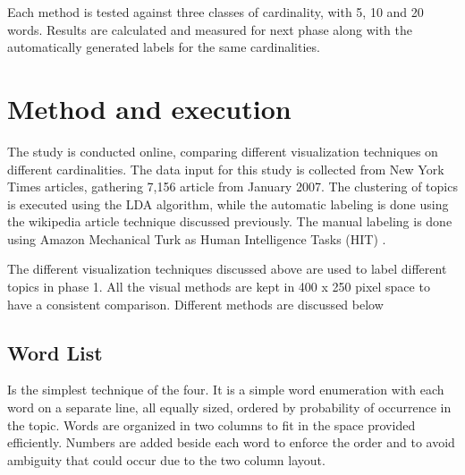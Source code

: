 \newParagraph
Each method is tested against three classes of cardinality, with 5, 10 and 20 words. Results are calculated and measured for next phase along with the automatically
generated labels for the same cardinalities.

\section{Method and execution}
\label{sec:method}

The study is conducted online, comparing different visualization techniques on different cardinalities. The data input for this study is collected from New
 York Times articles, gathering 7,156 article from January 2007. The clustering of topics is executed using the LDA algorithm, while the automatic labeling
 is done using the wikipedia article technique discussed previously. The manual labeling is done using Amazon Mechanical Turk as  Human Intelligence Tasks (HIT)
 .

\newParagraph
The different visualization techniques discussed above are used to label different topics in phase 1. All the visual methods are kept in 400 x 250 pixel space
to have a consistent comparison. Different methods are discussed below

\subsection{Word List}
Is the simplest technique of the four. It is a simple word enumeration with each word on a separate line, all equally sized, ordered by probability of occurrence
in the topic. Words are organized in two columns to fit in the space provided efficiently. Numbers are added beside each word to enforce the order and to avoid
ambiguity that could occur due to the two column layout.
